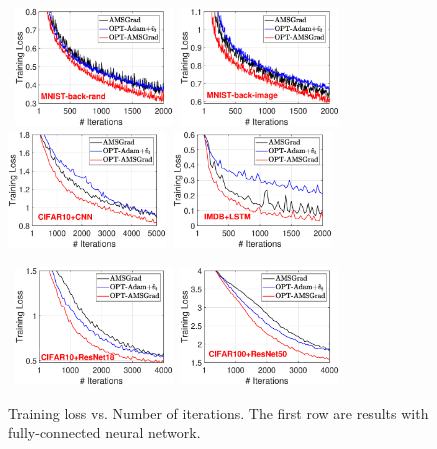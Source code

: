 \documentclass[11pt]{article}
\theoremstyle{k}
\begin{document}
\begin{figure}[t]
\vspace{-0.02in}
\begin{center}
\mbox{
\includegraphics[width=1.65in]{simulation/fig2/M_rand_train_loss_no1.eps}\hspace{-0.1in}
\includegraphics[width=1.65in]{simulation/fig2/M_image_train_loss_no1.eps}\hspace{-0.1in}
}
\mbox{
\includegraphics[width=1.65in]{simulation/fig2/cifar_cnn_train_loss_no1.eps}\hspace{-0.1in}
\includegraphics[width=1.65in]{simulation/fig2/imdb_lstm_train_loss_no1.eps}
}    

\mbox{
\includegraphics[width=1.65in]{simulation/fig2/cifar10_resnet_train_loss.eps}\hspace{-0.1in}
\includegraphics[width=1.65in]{simulation/fig2/cifar100_resnet_train_loss.eps}
}
\vspace{-0.02in}
\caption{Training loss vs. Number of iterations. The first row are results with fully-connected neural network.}
\label{train_loss}
\end{center}
\vspace{-0.04in}
\end{figure}
\end{document}
